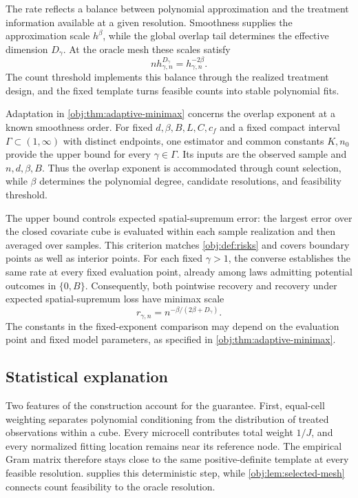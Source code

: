 The rate reflects a balance between polynomial approximation and the treatment information available at a given resolution. Smoothness supplies the approximation scale \(h^\beta\), while the global overlap tail determines the effective dimension \(D_\gamma\). At the oracle mesh these scales satisfy
\[
n h_{\gamma,n}^{D_\gamma}
=
h_{\gamma,n}^{-2\beta}.
\]
The count threshold implements this balance through the realized treatment design, and the fixed template turns feasible counts into stable polynomial fits.

Adaptation in \cref{obj:thm:adaptive-minimax} concerns the overlap exponent at a known smoothness order. For fixed \(d,\beta,B,L,C,c_f\) and a fixed compact interval \(\Gamma\subset(1,\infty)\) with distinct endpoints, one estimator and common constants \(K,n_0\) provide the upper bound for every \(\gamma\in\Gamma\). Its inputs are the observed sample and \(n,d,\beta,B\). Thus the overlap exponent is accommodated through count selection, while \(\beta\) determines the polynomial degree, candidate resolutions, and feasibility threshold.

The upper bound controls expected spatial-supremum error: the largest error over the closed covariate cube is evaluated within each sample realization and then averaged over samples. This criterion matches \cref{obj:def:risks} and covers boundary points as well as interior points. For each fixed \(\gamma>1\), the converse establishes the same rate at every fixed evaluation point, already among laws admitting potential outcomes in \(\{0,B\}\). Consequently, both pointwise recovery and recovery under expected spatial-supremum loss have minimax scale
\[
r_{\gamma,n}
=
n^{-\beta/(2\beta+D_\gamma)}.
\]
The constants in the fixed-exponent comparison may depend on the evaluation point and fixed model parameters, as specified in \cref{obj:thm:adaptive-minimax}.

\subsection{Statistical explanation}

Two features of the construction account for the guarantee. First, equal-cell weighting separates polynomial conditioning from the distribution of treated observations within a cube. Every microcell contributes total weight \(1/J\), and every normalized fitting location remains near its reference node. The empirical Gram matrix therefore stays close to the same positive-definite template at every feasible resolution.  supplies this deterministic step, while \cref{obj:lem:selected-mesh} connects count feasibility to the oracle resolution.

